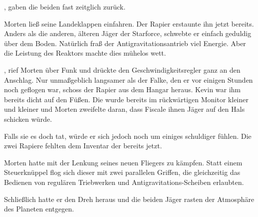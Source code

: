 \par

, gaben die beiden fast zeitglich zurück.

\par

Morten ließ seine Landeklappen einfahren. Der Rapier erstaunte ihn jetzt bereits. Anders als die anderen, älteren Jäger der Starforce, schwebte er einfach geduldig über dem Boden. Natürlich fraß der Antigravitationsantrieb viel Energie. Aber die Leistung des Reaktors machte dies mühelos wett.

\par

, rief Morten über Funk und drückte den Geschwindigkeitsregler ganz an den Anschlag. Nur unmaßgeblich langsamer als der Falke, den er vor einigen Stunden noch geflogen war, schoss der Rapier aus dem Hangar heraus. Kevin war ihm bereits dicht auf den Füßen. Die  wurde bereits im rückwärtigen Monitor kleiner und kleiner und Morten zweifelte daran, dass Fiscale ihnen Jäger auf den Hals schicken würde.

\par

Falls sie es doch tat, würde er sich jedoch noch um einiges schuldiger fühlen. Die zwei Rapiere fehlten dem Inventar der  bereits jetzt.

\par

Morten hatte mit der Lenkung seines neuen Fliegers zu kämpfen. Statt einem Steuerknüppel flog sich dieser mit zwei parallelen Griffen, die gleichzeitig das Bedienen von regulären Triebwerken und Antigravitations-Scheiben erlaubten.

\par

Schließlich hatte er den Dreh heraus und die beiden Jäger rasten der Atmosphäre des Planeten entgegen.